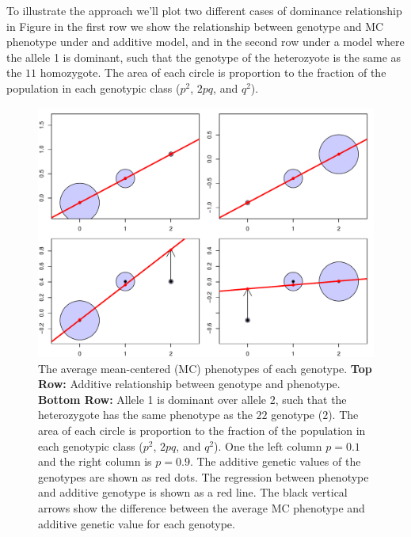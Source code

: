 To illustrate the approach we'll plot two different cases of dominance relationship in Figure \label{fig:add_dom} in the first row we show the
relationship between genotype and MC phenotype under and additive model,
and in the second row under a model where the allele 1 is dominant,
such that the genotype of the heterozyote is the same as the $11$
homozygote. The area of each circle is proportion to the fraction of
the population in each genotypic class ($p^2$, $2pq$, and $q^2$). 

\begin{figure}
\begin{center}
\includegraphics[width=\textwidth]{figures/additive_effect.pdf}
\end{center}
\caption{The average mean-centered (MC) phenotypes of each genotype. 
{\bf Top Row:} Additive relationship between genotype and phenotype. 
{\bf Bottom Row:} Allele 1 is dominant over allele 2, such that the
heterozygote has the same phenotype as the $22$ genotype ($2$). 
The area of each circle is proportion to the fraction of
the population in each genotypic class ($p^2$, $2pq$, and $q^2$). 
One the left column $p=0.1$ and the right column is $p=0.9$.
The additive genetic values of the genotypes are shown as
  red dots. The regression between phenotype and additive genotype is
  shown as a red line. The black vertical arrows show the difference
between the average MC phenotype and additive genetic value for each genotype. } \label{fig:add_dom}
\end{figure}

